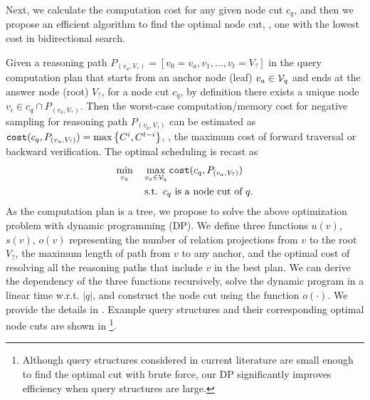 Next, we calculate the computation cost for any given node cut $c_q$, and then we propose an efficient algorithm to find the optimal node cut, \ie, one with the lowest cost in bidirectional search.

Given a reasoning path $P_{(v_a, V_?)} = [v_0 = v_a, v_1, \ldots, v_t = V_?]$ in the query computation plan that starts from an anchor node (leaf) $v_a \in \mathcal{V}_q$ and ends at the answer node (root) $V_?$, for a node cut $c_q$, by definition there exists a unique node $v_i \in c_q \cap P_{(v_a, V_?)}$. Then the worst-case computation/memory cost for negative sampling for reasoning path $P_{(v_a, V_?)}$ can be estimated as $\texttt{cost}(c_q, P_{(v_a, V_?)}) = \max\left\{C^{i}, C^{t-i}\right\}$, \ie, the maximum cost of forward traversal or backward verification. The optimal scheduling is recast as 
\begin{eqnarray}
	\min_{c_q} \quad & \max_{v_a \in \mathcal{V}_q} \texttt{cost}(c_q, P_{(v_a, V_?)}) \nonumber \\
	\quad & \mathop{\mathrm{s.t.}} \,\, c_q \text{ is a node cut of } q. \label{eq:optimal_sheduling}
\end{eqnarray}
As the computation plan is a tree, we propose to solve the above optimization problem with dynamic programming (DP). We define three functions $u(v)$, $s(v)$, $o(v)$ representing the number of relation projections from $v$ to the root $V_?$, the maximum length of path from $v$ to any anchor, and the optimal cost of resolving all the reasoning paths that include $v$ in the best plan. We can derive the dependency of the three functions recursively, solve the dynamic program in a linear time w.r.t. $|q|$, and construct the node cut using the function $o(\cdot)$. We provide the details in . Example query structures and their corresponding optimal node cuts are shown in \footnote{Although query structures considered in current literature are small enough to find the optimal cut with brute force, our DP significantly improves efficiency when query structures are large.}.
